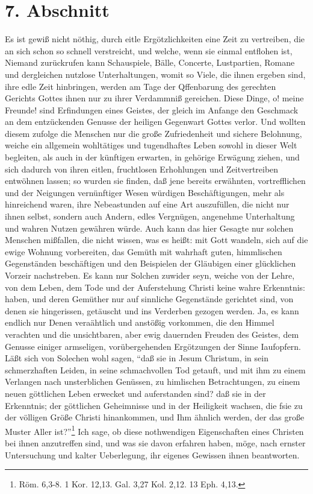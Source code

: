 \section{7. Abschnitt}

Es ist gewiß nicht nöthig, durch eitle Ergötzlichkeiten eine Zeit zu vertreiben, die an sich schon so schnell verstreicht, und welche, wenn sie einmal entflohen ist, Niemand zurückrufen kann Schauspiele, Bälle, Concerte, Lustpartien, Romane und dergleichen nutzlose Unterhaltungen, womit so Viele, die ihnen ergeben sind, ihre edle Zeit hinbringen, werden am Tage der Qffenbarung des gerechten Gerichts Gottes ihnen nur zu ihrer Verdammniß gereichen. Diese Dinge, o! meine Freunde! sind Erfindungen eines Geistes, der gleich im Anfange den Geschmack an dem entzückenden Genusse der heiligen Gegenwart Gottes verlor. Und wollten diesem zufolge die Menschen nur die große Zufriedenheit und sichere Belohnung, weiche ein allgemein wohltätiges und tugendhaftes Leben sowohl in dieser Welt begleiten, als auch in der künftigen erwarten, in gehörige Erwägung ziehen, und sich dadurch von ihren eitlen, fruchtlosen Erhohlungen und Zeitvertreiben entwöhnen lassen; so wurden sie finden, daß jene bereits erwähnten, vortrefflichen und der Neigungen vernünftiger Wesen würdigen Beschäftigungen, mehr als hinreichend waren, ihre Nebeastunden auf eine Art auszufüllen, die nicht nur ihnen selbst, sondern auch Andern, edles Vergnügen, angenehme Unterhaltung und wahren Nutzen gewähren würde. Auch kann das hier Gesagte nur solchen Menschen mißfallen, die nicht wissen, was es heißt: mit Gott wandeln, sich auf die ewige Wohnung vorbereiten, das Gemüth mit wahrhaft guten, himmlischen Gegenständen beschäftigen und den Beispielen der Gläubigen einer glücklichen Vorzeir nachstreben. Es kann nur Solchen zuwider seyn, weiche von der Lehre, von dem Leben, dem Tode und der Auferstehung Christi keine wahre Erkenntnis: haben, und deren Gemüther nur auf sinnliche Gegenstände gerichtet sind, von denen sie hingerissen, getäuscht und ins Verderben gezogen werden. Ja, es kann endlich nur Denen veraähtlich und anstößig vorkommen, die den Himmel verachten und die unsichtbaren, aber ewig dauernden Freuden des Geistes, dem Genusse einiger armseligen, vorübergehenden Ergötzungen der Sinne Iaufopfern. Läßt sich von Solechen wohl sagen, "`daß sie in Jesum Christum, in sein schmerzhaften Leiden, in seine schmachvollen Tod getauft, und mit ihm zu einem Verlangen nach unsterblichen Genüssen, zu himlischen Betrachtungen, zu einem neuen göttlichen Leben erwecket und auferstanden sind? daß sie in der Erkenntnis; der göttlichen Geheimnisse und in der Heiligkeit wachsen, die fsie zu der völligen Größe Christi hinankommen, und Ihm ähnlich werden, der das große Muster Aller ist?"'\footnote{Röm. 6,3-8. 1 Kor. 12,13. Gal. 3,27 Kol. 2,12. 13 Eph. 4,13.} Ich sage, ob diese nothwendigen Eigenschaften eines Christen bei ihnen anzutreffen sind, und was sie davon erfahren haben, möge, nach ernster Untersuchung und kalter Ueberlegung, ihr eigenes Gewissen ihnen beantworten.

